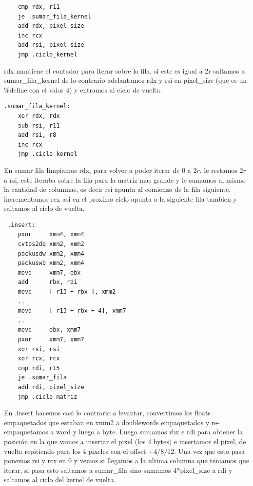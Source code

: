 \documentclass[a4paper]{article}
\begin{document}
\begin{codesnippet}
\begin{verbatim}
    cmp rdx, r11
    je .sumar_fila_kernel
    add rdx, pixel_size
    inc rcx
    add rsi, pixel_size
    jmp .ciclo_kernel
\end{verbatim}
\end{codesnippet}

rdx mantiene el contador para iterar sobre la fila, si este es igual a 2r saltamos a sumar\_fila\_kernel de lo contrario adelantamos rdx y rsi en pixel\_size (que es un \%define con el valor $4$) y entramos al ciclo de vuelta.


\begin{codesnippet}
\begin{verbatim}
.sumar_fila_kernel:
    xor rdx, rdx
    sub rsi, r11                      
    add rsi, r8                        
    inc rcx
    jmp .ciclo_kernel
\end{verbatim}
\end{codesnippet}


 En sumar fila limpiamos rdx, para volver a poder iterar de $0$ a $2r$, le restamos $2r$ a rsi, este iteraba sobre la fila para la matriz mas grande y le sumamos al mismo la cantidad de columnas, es decir rsi apunta al comienzo de la fila siguiente, incrementamos rcx asi en el proximo ciclo apunta a la siguiente fila tambien y saltamos al ciclo de vuelta.

\begin{codesnippet}
\begin{verbatim}
 .insert:
    pxor     xmm4, xmm4
    cvtps2dq xmm2, xmm2                 
    packusdw xmm2, xmm4                 
    packuswb xmm2, xmm4                 
    movd     xmm7, ebx
    add      rbx, rdi
    movd     [ r13 + rbx ], xmm2           
    ..
    movd	 [ r13 + rbx + 4], xmm7
    ..
    movd     ebx, xmm7
    pxor     xmm7, xmm7
    xor rsi, rsi
    xor rcx, rcx
    cmp rdi, r15
    je .sumar_fila
    add rdi, pixel_size
    jmp .ciclo_matriz
\end{verbatim}
\end{codesnippet}

En .insert hacemos casi lo contrario a levantar, convertimos los floats empaquetados que estaban en xmm2 a doublewords empaquetados y re-empaquetamos a word y luego a byte. Luego sumamos rbx e rdi para obtener la posición en la que vamos a insertar el pixel (los 4 bytes) e insertamos el pixel, de vuelta repitiendo para los 4 pixeles con el offset $+4/8/12$. Una vez que esto pasa ponemos rsi y rcx en $0$ y vemos si llegamos a la ultima columna que teniamos que iterar, si pasa esto saltamos a sumar\_fila sino sumamos 4*pixel\_size a rdi y saltamos al ciclo del kernel de vuelta.
\end{document}
